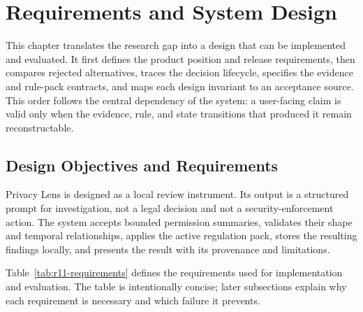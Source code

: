\section{Requirements and System Design}

This chapter translates the research gap into a design that can be implemented and evaluated. It first defines the product position and release requirements, then compares rejected alternatives, traces the decision lifecycle, specifies the evidence and rule-pack contracts, and maps each design invariant to an acceptance source. This order follows the central dependency of the system: a user-facing claim is valid only when the evidence, rule, and state transitions that produced it remain reconstructable.

\subsection{Design Objectives and Requirements}

Privacy Lens is designed as a local review instrument. Its output is a structured prompt for investigation, not a legal decision and not a security-enforcement action. The system accepts bounded permission summaries, validates their shape and temporal relationships, applies the active regulation pack, stores the resulting findings locally, and presents the result with its provenance and limitations.

Table~\ref{tab:r11-requirements} defines the requirements used for implementation and evaluation. The table is intentionally concise; later subsections explain why each requirement is necessary and which failure it prevents.

